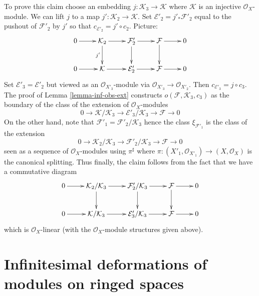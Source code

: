 \begin{remark}
\medskip\noindent
To prove this claim choose an embedding $j : \mathcal{K}_3 \to \mathcal{K}$
where $\mathcal{K}$ is an injective $\mathcal{O}_X$-module.
We can lift $j$ to a map $j' : \mathcal{K}_2 \to \mathcal{K}$.
Set $\mathcal{E}'_2 = j'_*\mathcal{F}'_2$ equal to the pushout
of $\mathcal{F}'_2$ by $j'$ so that $c_{\mathcal{E}'_2} = j' \circ c_2$.
Picture:
$$
\xymatrix{
0 \ar[r] &
\mathcal{K}_2 \ar[r] \ar[d]_{j'} &
\mathcal{F}'_2 \ar[r] \ar[d] &
\mathcal{F} \ar[r] \ar[d] & 0 \\
0 \ar[r] &
\mathcal{K} \ar[r] &
\mathcal{E}'_2 \ar[r] &
\mathcal{F} \ar[r] & 0
}
$$
Set $\mathcal{E}'_3 = \mathcal{E}'_2$ but viewed as an
$\mathcal{O}_{X'_3}$-module via $\mathcal{O}_{X'_3} \to \mathcal{O}_{X'_2}$.
Then $c_{\mathcal{E}'_3} = j \circ c_3$.
The proof of Lemma \ref{lemma-inf-obs-ext} constructs
$o(\mathcal{F}, \mathcal{K}_3, c_3)$
as the boundary of the class of the extension of $\mathcal{O}_X$-modules
$$
0 \to
\mathcal{K}/\mathcal{K}_3 \to
\mathcal{E}'_3/\mathcal{K}_3 \to
\mathcal{F} \to 0
$$
On the other hand, note that $\mathcal{F}'_1 = \mathcal{F}'_2/\mathcal{K}_3$
hence the class $\xi_{\mathcal{F}'_1}$ is the class
of the extension
$$
0 \to \mathcal{K}_2/\mathcal{K}_3 \to \mathcal{F}'_2/\mathcal{K}_3
\to \mathcal{F} \to 0
$$
seen as a sequence of $\mathcal{O}_X$-modules using $\pi^\sharp$
where $\pi : (X'_1, \mathcal{O}_{X'_1}) \to (X, \mathcal{O}_X)$
is the canonical splitting.
Thus finally, the claim follows from the fact that we have
a commutative diagram
$$
\xymatrix{
0 \ar[r] &
\mathcal{K}_2/\mathcal{K}_3 \ar[r] \ar[d] &
\mathcal{F}'_2/\mathcal{K}_3 \ar[r] \ar[d] &
\mathcal{F} \ar[r] \ar[d] & 0 \\
0 \ar[r] &
\mathcal{K}/\mathcal{K}_3 \ar[r] &
\mathcal{E}'_3/\mathcal{K}_3 \ar[r] &
\mathcal{F} \ar[r] & 0
}
$$
which is $\mathcal{O}_X$-linear (with the $\mathcal{O}_X$-module
structures given above).
\end{remark}








\section{Infinitesimal deformations of modules on ringed spaces}
\label{section-deformation-modules}

